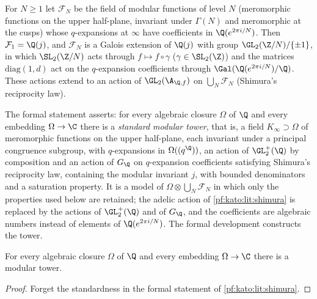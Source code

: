 \begin{littheorem}\label{pf:kato:lit:shimura}
For $N\ge1$ let $\mathcal F_N$ be the field of modular functions of level $N$ (meromorphic functions on the upper half-plane, invariant
under $\Gamma(N)$ and meromorphic at the cusps) whose $q$-expansions at $\infty$ have coefficients in $\Q(e^{2\pi i/N})$. Then
$\mathcal F_1=\Q(j)$, and $\mathcal F_N$ is a Galois extension of $\Q(j)$ with group $\GL_2(\Z/N)/\{\pm1\}$, in which $\SL_2(\Z/N)$ acts through
$f\mapsto f\circ\gamma$ ($\gamma\in\SL_2(\Z)$) and the matrices $\mathrm{diag}(1,d)$ act on the $q$-expansion coefficients through
$\Gal(\Q(e^{2\pi i/N})/\Q)$. These actions extend to an action of $\GL_2(\A_{\Q,f})$ on $\bigcup_N\mathcal F_N$ (Shimura's reciprocity law).
\end{littheorem}

\begin{remark}\label{pf:kato:rem:shimura}
The formal statement asserts: for every algebraic closure $\Omega$ of $\Q$ and every embedding $\Omega\to\C$ there is a \emph{standard
modular tower}, that is, a field $K_\infty\supset\Omega$ of meromorphic functions on the upper half-plane, each invariant under a principal
congruence subgroup, with $q$-expansions in $\Omega((q^{\Q}))$, an action of $\GL_2^+(\Q)$ by composition and an action of $G_\Q$ on
$q$-expansion coefficients satisfying Shimura's reciprocity law, containing the modular invariant $j$, with bounded denominators and a
saturation property. It is a model of $\Omega\otimes\bigcup_N\mathcal F_N$ in which only the properties used below are retained; the
adelic action of \cref{pf:kato:lit:shimura} is replaced by the actions of $\GL_2^+(\Q)$ and of $G_\Q$, and the coefficients are
algebraic numbers instead of elements of $\Q(e^{2\pi i/N})$. The formal development constructs the tower.
\end{remark}

\begin{corollary}\label{pf:kato:towerex}
For every algebraic closure $\Omega$ of $\Q$ and every embedding $\Omega\to\C$ there is a modular tower.
\end{corollary}

\begin{proof}
Forget the standardness in the formal statement of \cref{pf:kato:lit:shimura}.
\end{proof}


